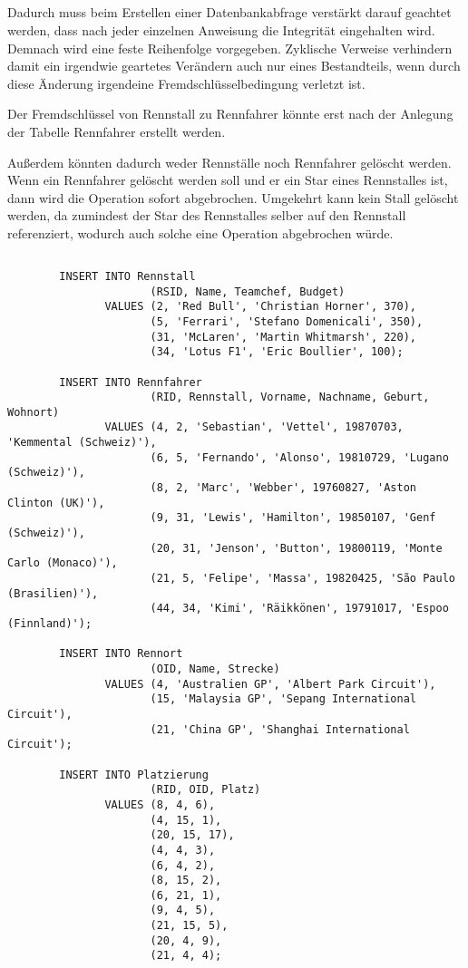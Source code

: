 \documentclass[ngerman]{gdb-aufgabenblatt}
\begin{document}
	\subsection{} %
		Dadurch muss beim Erstellen einer Datenbankabfrage verstärkt darauf geachtet werden, dass nach jeder einzelnen Anweisung die Integrität eingehalten wird. Demnach wird eine feste Reihenfolge vorgegeben. Zyklische Verweise verhindern damit ein irgendwie geartetes Verändern auch nur eines Bestandteils, wenn durch diese Änderung irgendeine Fremdschlüsselbedingung verletzt ist.
		
		Der Fremdschlüssel von Rennstall zu Rennfahrer könnte erst nach der Anlegung der Tabelle Rennfahrer erstellt werden.
		
		Außerdem könnten dadurch weder Rennställe noch Rennfahrer gelöscht werden. Wenn ein Rennfahrer gelöscht werden soll und er ein Star eines Rennstalles ist, dann wird die Operation sofort abgebrochen. Umgekehrt kann kein Stall gelöscht werden, da zumindest der Star des Rennstalles selber auf den Rennstall referenziert, wodurch auch solche eine Operation abgebrochen würde.
	\subsection{} %
	\begin{verbatim}
	    INSERT INTO Rennstall
	                  (RSID, Name, Teamchef, Budget)
	           VALUES (2, 'Red Bull', 'Christian Horner', 370),
	                  (5, 'Ferrari', 'Stefano Domenicali', 350),
	                  (31, 'McLaren', 'Martin Whitmarsh', 220),
	                  (34, 'Lotus F1', 'Eric Boullier', 100);
	    
	    INSERT INTO Rennfahrer
	                  (RID, Rennstall, Vorname, Nachname, Geburt, Wohnort)
	           VALUES (4, 2, 'Sebastian', 'Vettel', 19870703, 'Kemmental (Schweiz)'),
	                  (6, 5, 'Fernando', 'Alonso', 19810729, 'Lugano (Schweiz)'),
	                  (8, 2, 'Marc', 'Webber', 19760827, 'Aston Clinton (UK)'),
	                  (9, 31, 'Lewis', 'Hamilton', 19850107, 'Genf (Schweiz)'),
	                  (20, 31, 'Jenson', 'Button', 19800119, 'Monte Carlo (Monaco)'),
	                  (21, 5, 'Felipe', 'Massa', 19820425, 'São Paulo (Brasilien)'),
	                  (44, 34, 'Kimi', 'Räikkönen', 19791017, 'Espoo (Finnland)');
	                  
	    INSERT INTO Rennort
	                  (OID, Name, Strecke)
	           VALUES (4, 'Australien GP', 'Albert Park Circuit'),
	                  (15, 'Malaysia GP', 'Sepang International Circuit'),
	                  (21, 'China GP', 'Shanghai International Circuit');
	                  
	    INSERT INTO Platzierung
	                  (RID, OID, Platz)
	           VALUES (8, 4, 6),
	                  (4, 15, 1),
	                  (20, 15, 17),
	                  (4, 4, 3),
	                  (6, 4, 2),
	                  (8, 15, 2),
	                  (6, 21, 1),
	                  (9, 4, 5),
	                  (21, 15, 5),
	                  (20, 4, 9),
	                  (21, 4, 4); 
	\end{verbatim}
\end{document}

